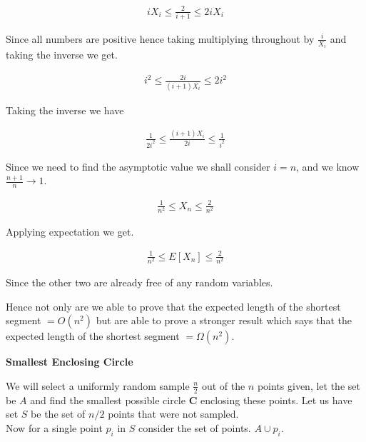 \documentclass{assignment}
\begin{document}
\begin{problemlist}
\begin{problem}
\begin{answer}
\begin{enumerate}
\begin{eqnarray}
i X_i \leq  \frac{2}{i+1}  \leq  2iX_i
\end{eqnarray}

Since all numbers are positive hence taking multiplying throughout by $\frac{i}{X_i}$ and taking the inverse we get. 

\begin{eqnarray}
i^2 \leq  \frac{2i}{(i+1)X_i}  \leq  2i^2
\end{eqnarray}

Taking the inverse we have 

\begin{eqnarray}
\frac{1}{2 i^2} \leq  \frac{(i+1)X_i}{2i}  \leq  \frac{1}{i^2}
\end{eqnarray}

Since we need to find the asymptotic value we shall consider $i=n$, and we know $\frac{n+1}{n} \rightarrow 1$.

\begin{eqnarray}
\frac{1}{n^2} \leq {X_n}   \leq  \frac{2}{n^2}
\end{eqnarray}

Applying expectation we get. 

\begin{eqnarray}
\frac{1}{n^2} \leq {E[X_n]}   \leq  \frac{2}{n^2}
\end{eqnarray}

Since the other two are already free of any random variables. 

Hence not only are we able to prove that the expected length of the shortest segment $=O(n^2)$ but are able to prove a stronger result which says that the expected length of the shortest segment $=\Omega (n^2)$. 

\end{enumerate}




\end{answer}


\end{problem}
\pbitem
\begin{problem} 
\textbf{Smallest Enclosing Circle}\\
\begin{answer}
We will select a uniformly random sample $\frac{n}{2}$ out of the $n$  points given, let the set be $A$ and find the smallest possible circle $\mathbf{C}$ enclosing these points. Let us have set $S$ be the set of $n/2$ points that were not sampled. \\
Now for a single point $p_i$ in $S$ consider the set of points. $A \cup p_i$. 


\end{answer}
\end{problem}
\end{problemlist}
\end{document}
